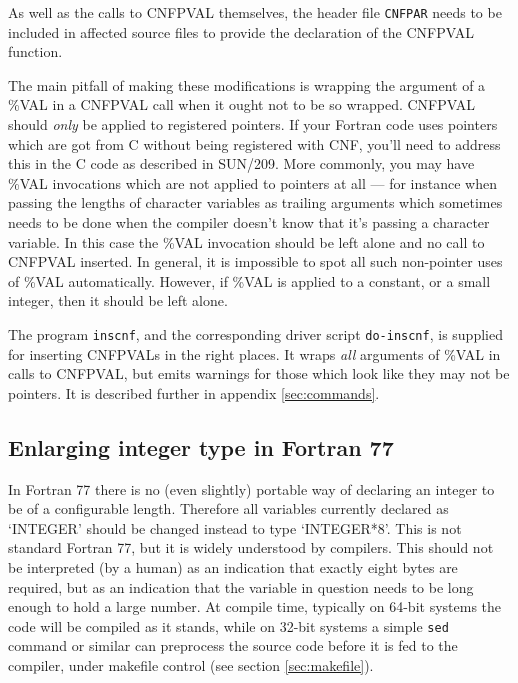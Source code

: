 \documentclass[twoside,11pt]{article}
\newcommand{\htmlref}[2]{#1}
\newcommand{\latexhtml}[2]{#1}
\newcommand{\xref}[3]{#1}
\renewcommand{\_}{\texttt{\symbol{95}}}
\newcommand{\xroutine}[1]{\htmlref{{\tt #1}}{#1}}
\newcommand{\xdofilter}[1]{\htmlref{{\tt do-#1}}{do-xxx}}
\newcommand{\file}[1]{{\tt #1}}
\begin{document}
As well as the calls to CNF\_PVAL themselves,
the header file \file{CNF\_PAR} needs to be included
in affected source files to provide the declaration of the CNF\_PVAL function.

The main pitfall of making these modifications is
wrapping the argument of a \%VAL in a CNF\_PVAL call when it ought
not to be so wrapped.
CNF\_PVAL should {\em only\/} be applied to registered pointers.
If your Fortran code uses pointers which are got from C without
being registered with CNF, you'll need to address this in the C code
as described in \xref{SUN/209}{sun209}{pointers}.
More commonly, you may have \%VAL invocations which are not
applied to pointers at all --- for instance when passing
the lengths of character variables as trailing arguments
which sometimes needs to be done when the compiler doesn't know that
it's passing a character variable.  In this case the \%VAL
invocation should be left alone and no call to CNF\_PVAL inserted.
In general, it is impossible to spot all such non-pointer uses
of \%VAL automatically.  However, if \%VAL is applied to a constant,
or a small integer, then it should be left alone.

The program \xroutine{inscnf}, and the corresponding driver script
\xdofilter{inscnf}, is supplied for inserting CNF\_PVALs
in the right places.  It wraps {\em all\/} arguments of \%VAL
in calls to CNF\_PVAL, but emits warnings for those which look like
they may not be pointers.
It is described further in
\latexhtml{appendix \ref{sec:commands}}{\htmlref{the appendix}{inscnf}}.

\subsection{Enlarging integer type in Fortran 77\label{sec:fint}}


In Fortran 77 there is no (even slightly) portable way of declaring
an integer to be of a configurable length.
Therefore all variables currently declared as `INTEGER'
should be changed instead to type `INTEGER*8'.
This is not standard Fortran 77, but it is widely understood by compilers.
This should not be interpreted (by a human) as an indication that exactly
eight bytes are required, but as an indication that
the variable in question needs to be
long enough to hold a large number.
At compile time, typically on 64-bit systems the code will be compiled
as it stands, while on 32-bit systems a simple \file{sed} command or similar
can preprocess the source code before it is fed to the compiler,
under makefile control (see section \ref{sec:makefile}).
\end{document}
